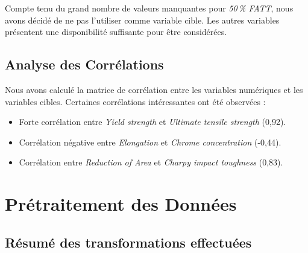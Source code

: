 \documentclass{article}
\begin{document}
Compte tenu du grand nombre de valeurs manquantes pour \textit{50\,\% FATT}, nous avons décidé de ne pas l'utiliser comme variable cible. Les autres variables présentent une disponibilité suffisante pour être considérées.

\subsection{Analyse des Corrélations}

Nous avons calculé la matrice de corrélation entre les variables numériques et les variables cibles. Certaines corrélations intéressantes ont été observées :

\begin{itemize}
    \item Forte corrélation entre \textit{Yield strength} et \textit{Ultimate tensile strength} (0,92).
    \item Corrélation négative entre \textit{Elongation} et \textit{Chrome concentration} (-0,44).
    \item Corrélation entre \textit{Reduction of Area} et \textit{Charpy impact toughness} (0,83).
\end{itemize}

\section{Prétraitement des Données}

\subsection{Résumé des transformations effectuées}
\end{document}

